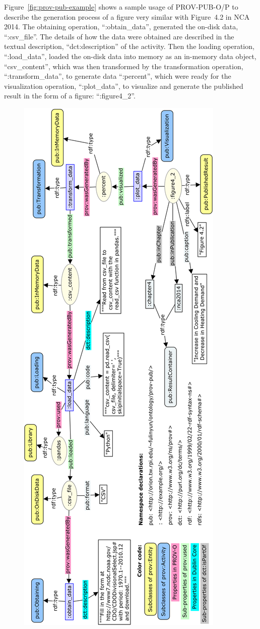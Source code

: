 Figure~\ref{fig:prov-pub-example} shows a sample usage of PROV-PUB-O/P to describe the generation process of a figure very similar with Figure~4.2 in NCA 2014. The obtaining operation, ``:obtain\_data'', generated the on-disk data, ``:csv\_file''. The details of how the data were obtained are described in the textual description, ``dct:description'' of the activity. Then the loading operation, ``:load\_data'', loaded the on-disk data into memory as an in-memory data object, ``csv\_content'', which was then transformed by the transformation operation, ``:transform\_data'', to generate data ``:percent'', which were ready for the visualization operation, ``:plot\_data'', to visualize and generate the published result in the form of a figure: ``:figure4\_2''. 

\begin{figure}
	\centering
	\includegraphics[height=\textheight]{model/ontology/prov-pub/prov-pub-example-bigger.png}

\end{figure}
